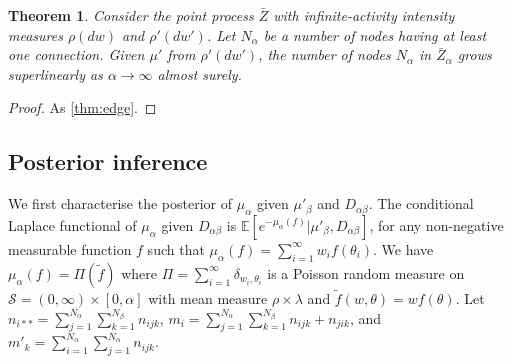 \documentclass{article}
\newtheorem{theorem}{Theorem}[section]
\begin{document}
\begin{theorem} Consider the point process $\bar{Z}$ with infinite-activity intensity measures $\rho(dw)$ and $\rho'(dw')$. Let $N_\alpha$ be a number of nodes having at least one connection. Given $\mu'$ from $\rho'(dw')$, the number of nodes $N_\alpha$ in $\bar{Z}_{\alpha}$ grows superlinearly as $\alpha \rightarrow \infty$ almost surely.
\end{theorem}
\begin{proof}
As \ref{thm:edge}.
\end{proof}

\subsection{Posterior inference}
We first characterise the posterior of $\mu_\alpha$ given $\mu'_\beta$ and $D_{\alpha\beta}$. The conditional Laplace functional of $\mu_\alpha$ given $D_{\alpha\beta}$ is $\mathbb{E}[e^{-\mu_\alpha(f)}|\mu'_\beta, D_{\alpha\beta}]$, for any non-negative measurable function $f$ such that $\mu_\alpha(f) = \sum_{i=1}^{\infty}w_i f(\theta_i)$. We have $\mu_\alpha(f) = \Pi(\tilde{f})$ where $\Pi = \sum_{i=1}^{\infty} \delta_{w_i, \theta_i}$ is a Poisson random measure on $\mathcal{S} = (0, \infty) \times [0, \alpha]$ with mean measure $\rho \times \lambda$ and $\tilde{f}(w, \theta) = wf(\theta)$. Let $n_{i**} = \sum_{j=1}^{N_\alpha}\sum_{k=1}^{N_\beta}n_{ijk}$, $m_i = \sum_{j=1}^{N_\alpha}\sum_{k=1}^{N_\beta} n_{ijk} + n_{jik}$, and $m'_k = \sum_{i=1}^{N_\alpha} \sum_{j=1}^{N_\alpha} n_{ijk}$.
\end{document}
